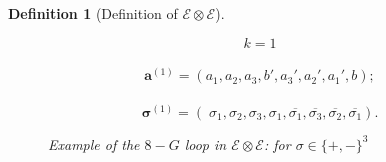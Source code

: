 \documentclass[10pt,reqno]{article}
\theoremstyle{plain} %
\newtheorem{definition}[theorem]{Definition}
\theoremstyle{remark}
\numberwithin{equation}{section}
\begin{document}
\begin{definition}[Definition of $\mathcal{E}\otimes  \mathcal{E}$]
\begin{figure}[ht]
\begin{minipage}{0.45\textwidth}
\begin{tikzpicture}[scale=1.0]
    \end{tikzpicture}
   
\end{minipage}%
\hfill
\begin{minipage}{0.45\textwidth} %
    \raggedright
    $$k=1 $$\\ 
    $$\textbf{a}^{(1 )}=( a_1, a_2, a_3, b', a_3', a_2', a_1',b);$$
    \\  
     $$\boldsymbol{\sigma}^{(1 )}=(\;\sigma_1, \sigma_2, \sigma_3,\sigma_1, \overline{\sigma_1},\overline{\sigma_3}, \overline{\sigma_2},\overline{\sigma_1} ).$$
\end{minipage}
 \caption{Example of the $8-G$ loop in $\mathcal{E}\otimes  \mathcal{E}$: for $\sigma\in \{+,-\}^3$}
    \label{fig:8shapedgraph}
\end{figure}


\end{definition}

 
\end{document}
